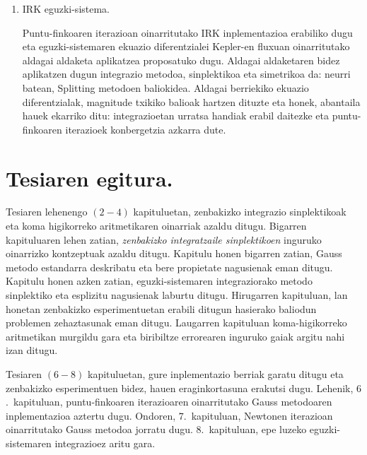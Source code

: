 \begin{enumerate}
\item IRK eguzki-sistema.

Puntu-finkoaren iterazioan oinarritutako IRK inplementazioa erabiliko dugu eta eguzki-sistemaren ekuazio diferentzialei Kepler-en fluxuan oinarritutako aldagai aldaketa aplikatzea proposatuko dugu. Aldagai aldaketaren bidez aplikatzen dugun integrazio metodoa, sinplektikoa eta simetrikoa da: neurri batean, Splitting metodoen baliokidea. Aldagai berriekiko ekuazio diferentzialak, magnitude txikiko balioak hartzen dituzte eta honek, abantaila hauek ekarriko ditu: integrazioetan urratsa handiak erabil daitezke eta puntu-finkoaren iterazioek konbergetzia azkarra dute.    




\end{enumerate}        


\section{Tesiaren egitura.}

Tesiaren lehenengo $(2-4)$ kapituluetan, zenbakizko integrazio sinplektikoak eta koma higikorreko aritmetikaren oinarriak azaldu ditugu. Bigarren kapituluaren lehen zatian, \emph{zenbakizko integratzaile sinplektikoen} inguruko oinarrizko kontzeptuak azaldu ditugu. Kapitulu honen bigarren zatian, Gauss metodo estandarra deskribatu eta bere propietate nagusienak eman ditugu. Kapitulu honen azken zatian, eguzki-sistemaren integraziorako metodo sinplektiko eta esplizitu nagusienak laburtu ditugu. Hirugarren kapituluan, lan honetan zenbakizko esperimentuetan erabili ditugun hasierako baliodun problemen zehaztasunak eman ditugu. Laugarren kapituluan koma-higikorreko aritmetikan murgildu gara eta biribiltze errorearen inguruko gaiak argitu nahi izan ditugu.

Tesiaren $(6-8)$ kapituluetan, gure inplementazio berriak garatu ditugu eta zenbakizko esperimentuen bidez, hauen eraginkortasuna erakutsi dugu. Lehenik, $6$.~kapituluan, puntu-finkoaren iterazioaren oinarritutako Gauss metodoaren inplementazioa aztertu dugu. Ondoren, $7$.~kapituluan, Newtonen iterazioan oinarritutako Gauss metodoa jorratu dugu. $8$.~kapituluan, epe luzeko eguzki-sistemaren integrazioez aritu gara.  

